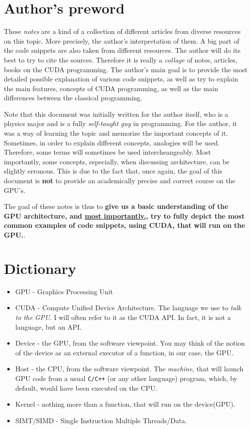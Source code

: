 
\section*{Author's preword}
\label{disclaimer}
These \textit{notes} are a kind of a collection of different articles from diverse resources on this topic. More precisely, the author's interpretation 
of them. A big part of the code snippets 
are also taken from different resources. The author will do its best to try to cite the sources. 
Therefore it is really a \textit{collage} of notes, articles, books on the CUDA programming.
The author's main goal is to provide the most detailed possible explanation of 
various code snippets, as well as try to explain the main features, concepts of CUDA programming, as well as the main differences between the classical programming.

Note that this document was initially written for the author itself, who is a physics major 
and is a fully \textit{self-taught guy} in programming. 
For the author, it was a way of learning the topic and memorize 
the important concepts of it. Sometimes, in order to explain different concepts, analogies will be used. 
Therefore, some terms will sometimes be used intercheangeably. Most importantly, some concepts, especially, when discussing architecture, 
can be slightly erronous. This is due to the fact that, once again, the goal of this document is \textbf{not} to provide 
an academically precise and correct course on the GPU's. 

The goal of these notes is thus to \textbf{give us a basic understanding of the 
GPU architecture, and \underline{most importantly,}, try to fully depict
the most common examples of code snippets, using CUDA, that will run on the GPU.}.

\section*{Dictionary}
\label{section:dictionary}
\begin{itemize}
   \setlength\itemsep{-0.5em}
   \item GPU - Graphics Processing Unit
   \item CUDA - Compute Unified Device Architecture. The language we use to \textit{talk to the GPU}. I will often refer to it as the CUDA API. In fact,
     it is not a language, but an API.
   \item Device - the GPU, from the software viewpoint. You may think of the notion of the 
   device as an external executor of a function, in our case, the GPU.
   \item Host - the CPU, from the software viewpoint. The \textit{machine}, that will launch GPU code from a
    usual \verb|C/C++| (or any other language) program, which, by default, would have been executed on the CPU.
   \item Kernel - nothing more than a function, that will run on the device(GPU).
   \item SIMT/SIMD - Single Instruction Multiple Threads/Data.
\end{itemize}



